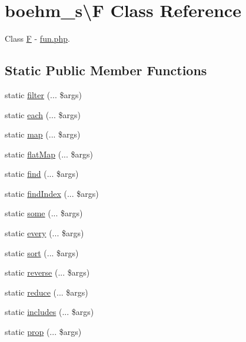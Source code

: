 \hypertarget{classboehm__s_1_1F}{}\section{boehm\+\_\+s\textbackslash{}F Class Reference}
\label{classboehm__s_1_1F}


Class \hyperlink{classboehm__s_1_1F}{F} -\/ \hyperlink{fun_8php}{fun.\+php}.  


\subsection*{Static Public Member Functions}
\begin{DoxyCompactItemize}
\item 
static \hyperlink{classboehm__s_1_1F_a80fe06fb52d10a68a0d6b36ca821463f}{filter} (... \$args)
\item 
static \hyperlink{classboehm__s_1_1F_adf594aee11edbf796efae99d00dc8f46}{each} (... \$args)
\item 
static \hyperlink{classboehm__s_1_1F_a5b9016a3452e48e05c20c3ca94e5b4e8}{map} (... \$args)
\item 
static \hyperlink{classboehm__s_1_1F_a92bf70afadb55e6b39bad69909c6e697}{flat\+Map} (... \$args)
\item 
static \hyperlink{classboehm__s_1_1F_a68db344c2eabeb0f3139ec3000a8b039}{find} (... \$args)
\item 
static \hyperlink{classboehm__s_1_1F_a385a847258b151462eb4fa8e6e06a069}{find\+Index} (... \$args)
\item 
static \hyperlink{classboehm__s_1_1F_aee63ff04d9ecde792865a5435a6e8cc9}{some} (... \$args)
\item 
static \hyperlink{classboehm__s_1_1F_a559bfb165c4ec768a49830173fa709e3}{every} (... \$args)
\item 
static \hyperlink{classboehm__s_1_1F_a742910125ee71afd3149a16262506600}{sort} (... \$args)
\item 
static \hyperlink{classboehm__s_1_1F_a560daa6ae48b7a41c82c6e42e747ec6a}{reverse} (... \$args)
\item 
static \hyperlink{classboehm__s_1_1F_a110a6463a6551b88915ed3ce87d56fb3}{reduce} (... \$args)
\item 
static \hyperlink{classboehm__s_1_1F_aa695a4a8ea655ab5d7011f205eb49de7}{includes} (... \$args)
\item 
static \hyperlink{classboehm__s_1_1F_a6c075d73d686e5bb71456a03e13d6d16}{prop} (... \$args)
\item 

\end{DoxyCompactItemize}
